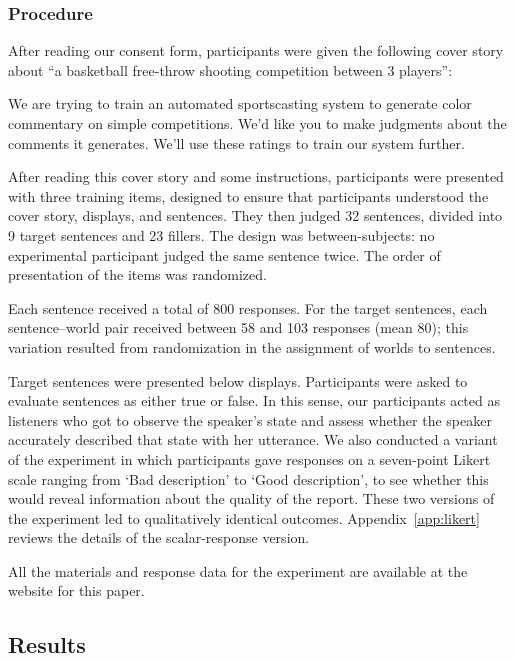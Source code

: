\documentclass[leqno,12pt]{article}
\newcommand{\Appendixref}[1]{Appendix~\ref{#1}}
\begin{document}
{\subsubsection{Procedure} 

After reading our consent form, participants were given the following
cover story about ``a basketball free-throw shooting competition
between 3 players'':
%
\begin{examples}
\item\label{coverstory} We are trying to train an automated
  sportscasting system to generate color commentary on simple
  competitions. We'd like you to make judgments about the comments it
  generates. We'll use these ratings to train our system further. 
\end{examples}

After reading this cover story and some instructions, participants
were presented with three training items, designed to ensure that
participants understood the cover story, displays, and sentences. They
then judged 32 sentences, divided into 9 target sentences and 23
fillers. The design was between-subjects: no experimental participant
judged the same sentence twice. The order of presentation of the items
was randomized.
 
Each sentence received a total of 800 responses. For the target
sentences, each sentence--world pair received between 58 and 103
responses (mean 80); this variation resulted from randomization in the
assignment of worlds to sentences.

Target sentences were presented below displays. Participants were
asked to evaluate sentences as either true or false. In this sense,
our participants acted as listeners who got to observe the speaker's
state and assess whether the speaker accurately described that state
with her utterance. We also conducted a variant of the experiment in
which participants gave responses on a seven-point Likert scale
ranging from `Bad description' to `Good description', to see whether
this would reveal information about the quality of the report. These
two versions of the experiment led to qualitatively identical
outcomes. \Appendixref{app:likert} reviews the details of the
scalar-response version.

All the materials and response data for the experiment are available
at the website for this paper.



\subsection{Results}\label{sec:binary:results}

}
\end{document}
